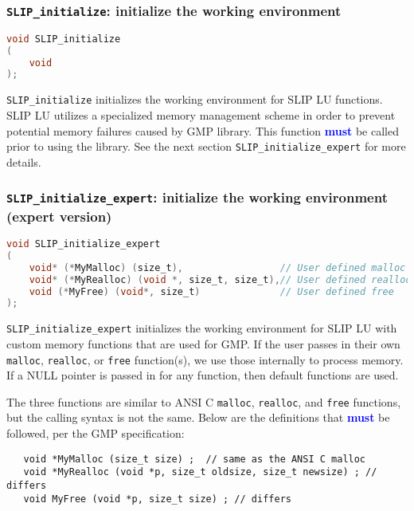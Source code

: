 \documentclass[11pt]{article}
\theoremstyle{definition}
\begin{document}
\cprotect\subsubsection{\verb|SLIP_initialize|: initialize the working environment}


\begin{lstlisting}[language=C,frame=single]
void SLIP_initialize
(
    void
);
\end{lstlisting}

\verb|SLIP_initialize| initializes the working environment for SLIP LU functions. SLIP LU utilizes a specialized memory management scheme in order to prevent potential memory failures caused by GMP library. This function \textcolor{blue}{\textbf{must}} be called prior to using the library. See the next section \verb|SLIP_initialize_expert| for more details.


\cprotect\subsubsection{\verb|SLIP_initialize_expert|: initialize the working environment (expert version)}

\begin{lstlisting}[language=C,frame=single]
void SLIP_initialize_expert
(
    void* (*MyMalloc) (size_t),                 // User defined malloc
    void* (*MyRealloc) (void *, size_t, size_t),// User defined realloc
    void (*MyFree) (void*, size_t)              // User defined free
);
\end{lstlisting}

\verb|SLIP_initialize_expert| initializes the working environment for SLIP LU with custom memory functions that are used for GMP. If the user passes in their
 own \verb|malloc|, \verb|realloc|, or \verb|free| function(s), we use those internally to process
 memory. If a NULL pointer is passed in for any function, then default functions are used.

  The three functions are similar to ANSI C \verb|malloc|, \verb|realloc|, and \verb|free|
  functions, but the calling syntax is not the same.  Below are the definitions that \textcolor{blue}{\textbf{must}} be followed, per the GMP specification:

\begin{verbatim}
   void *MyMalloc (size_t size) ;  // same as the ANSI C malloc
   void *MyRealloc (void *p, size_t oldsize, size_t newsize) ; // differs
   void MyFree (void *p, size_t size) ; // differs
\end{verbatim}
\end{document}
